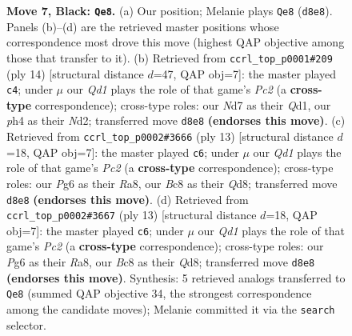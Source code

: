 \documentclass[11pt]{article}
\begin{document}
\begin{figure}[p]
\caption{\textbf{Move 7, Black: \texttt{Qe8}.} (a) Our position; Melanie plays \texttt{Qe8} (\texttt{d8e8}). Panels (b)--(d) are the retrieved master positions whose correspondence most drove this move (highest QAP objective among those that transfer to it). (b) Retrieved from \texttt{ccrl\_top\_p0001\#209} (ply 14) [structural distance $d$=47, QAP obj=7]: the master played \texttt{c4}; under $\mu$ our \emph{Qd1} plays the role of that game's \emph{Pc2} (a \textbf{cross-type} correspondence); cross-type roles: our \emph{N}d7 as their \emph{Q}d1, our \emph{p}h4 as their \emph{N}d2; transferred move \texttt{d8e8} \textbf{(endorses this move)}. (c) Retrieved from \texttt{ccrl\_top\_p0002\#3666} (ply 13) [structural distance $d$=18, QAP obj=7]: the master played \texttt{c6}; under $\mu$ our \emph{Qd1} plays the role of that game's \emph{Pc2} (a \textbf{cross-type} correspondence); cross-type roles: our \emph{P}g6 as their \emph{R}a8, our \emph{B}c8 as their \emph{Q}d8; transferred move \texttt{d8e8} \textbf{(endorses this move)}. (d) Retrieved from \texttt{ccrl\_top\_p0002\#3667} (ply 13) [structural distance $d$=18, QAP obj=7]: the master played \texttt{c6}; under $\mu$ our \emph{Qd1} plays the role of that game's \emph{Pc2} (a \textbf{cross-type} correspondence); cross-type roles: our \emph{P}g6 as their \emph{R}a8, our \emph{B}c8 as their \emph{Q}d8; transferred move \texttt{d8e8} \textbf{(endorses this move)}. Synthesis: 5 retrieved analogs transferred to \texttt{Qe8} (summed QAP objective 34, the strongest correspondence among the candidate moves); Melanie committed it via the \texttt{search} selector.}
\label{fig:thought-m13}
\end{figure}

\clearpage
\end{document}
